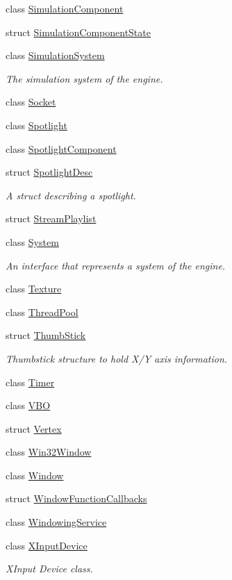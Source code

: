 \begin{DoxyCompactItemize}
class \hyperlink{class_blade_1_1_simulation_component}{Simulation\+Component}
\item 
struct \hyperlink{struct_blade_1_1_simulation_component_state}{Simulation\+Component\+State}
\item 
class \hyperlink{class_blade_1_1_simulation_system}{Simulation\+System}
\begin{DoxyCompactList}\small\item\em The simulation system of the engine. \end{DoxyCompactList}\item 
class \hyperlink{class_blade_1_1_socket}{Socket}
\item 
class \hyperlink{class_blade_1_1_spotlight}{Spotlight}
\item 
class \hyperlink{class_blade_1_1_spotlight_component}{Spotlight\+Component}
\item 
struct \hyperlink{struct_blade_1_1_spotlight_desc}{Spotlight\+Desc}
\begin{DoxyCompactList}\small\item\em A struct describing a spotlight. \end{DoxyCompactList}\item 
struct \hyperlink{struct_blade_1_1_stream_playlist}{Stream\+Playlist}
\item 
class \hyperlink{class_blade_1_1_system}{System}
\begin{DoxyCompactList}\small\item\em An interface that represents a system of the engine. \end{DoxyCompactList}\item 
class \hyperlink{class_blade_1_1_texture}{Texture}
\item 
class \hyperlink{class_blade_1_1_thread_pool}{Thread\+Pool}
\item 
struct \hyperlink{struct_blade_1_1_thumb_stick}{Thumb\+Stick}
\begin{DoxyCompactList}\small\item\em Thumbstick structure to hold X/Y axis information. \end{DoxyCompactList}\item 
class \hyperlink{class_blade_1_1_timer}{Timer}
\item 
class \hyperlink{class_blade_1_1_v_b_o}{V\+BO}
\item 
struct \hyperlink{struct_blade_1_1_vertex}{Vertex}
\item 
class \hyperlink{class_blade_1_1_win32_window}{Win32\+Window}
\item 
class \hyperlink{class_blade_1_1_window}{Window}
\item 
struct \hyperlink{struct_blade_1_1_window_function_callbacks}{Window\+Function\+Callbacks}
\item 
class \hyperlink{class_blade_1_1_windowing_service}{Windowing\+Service}
\item 
class \hyperlink{class_blade_1_1_x_input_device}{X\+Input\+Device}
\begin{DoxyCompactList}\small\item\em X\+Input Device class. \end{DoxyCompactList}\end{DoxyCompactItemize}
